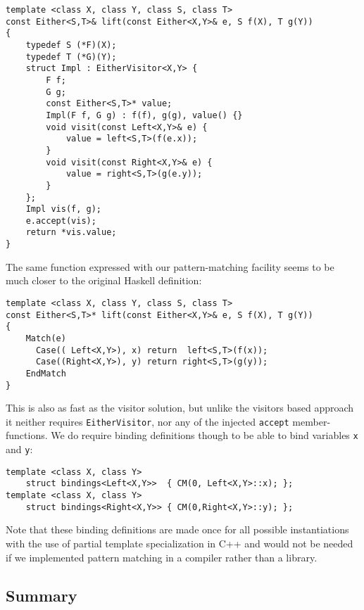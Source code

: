 \documentclass[preprint]{sigplanconf}
\makeatletter
\DeclareRobustCommand{\code}[1]{{\lstinline[breaklines=false,escapechar=@]{#1}}}
\makeatother
\begin{document}
\begin{lstlisting}
template <class X, class Y, class S, class T>
const Either<S,T>& lift(const Either<X,Y>& e, S f(X), T g(Y))
{
    typedef S (*F)(X);
    typedef T (*G)(Y);
    struct Impl : EitherVisitor<X,Y> {
        F f;
        G g;
        const Either<S,T>* value;
        Impl(F f, G g) : f(f), g(g), value() {}
        void visit(const Left<X,Y>& e) {
            value = left<S,T>(f(e.x));
        }
        void visit(const Right<X,Y>& e) {
            value = right<S,T>(g(e.y));
        }
    };
    Impl vis(f, g);
    e.accept(vis);
    return *vis.value;
}
\end{lstlisting}

The same function expressed with our pattern-matching facility seems to be much 
closer to the original Haskell definition:

\begin{lstlisting}[keepspaces,columns=flexible]
template <class X, class Y, class S, class T>
const Either<S,T>* lift(const Either<X,Y>& e, S f(X), T g(Y))
{
    Match(e)
      Case(( Left<X,Y>), x) return  left<S,T>(f(x));
      Case((Right<X,Y>), y) return right<S,T>(g(y));
    EndMatch
}
\end{lstlisting}

This is also as fast as the visitor solution, but unlike the visitors based 
approach it neither requires \code{EitherVisitor}, nor any of the injected 
\code{accept} member-functions. We do require binding definitions though to be 
able to bind variables \code{x} and \code{y}:


\begin{lstlisting}[keepspaces,columns=flexible]
template <class X, class Y> 
    struct bindings<Left<X,Y>>  { CM(0, Left<X,Y>::x); };
template <class X, class Y> 
    struct bindings<Right<X,Y>> { CM(0,Right<X,Y>::y); };
\end{lstlisting}

Note that these binding definitions are made once for all possible instantiations 
with the use of partial template specialization in C++ and would not be needed 
if we implemented pattern matching in a compiler rather than a library.

\subsection{Summary}
\end{document}

